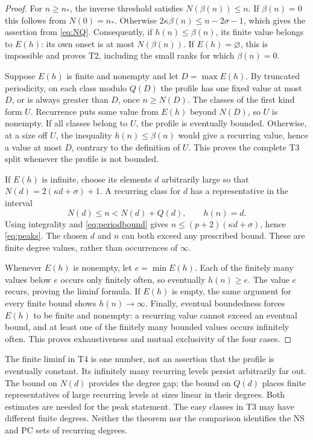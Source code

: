 \documentclass[11pt,a4paper]{article}
\theoremstyle{definition}\newtheorem{definition}[theorem]{Definition}
\theoremstyle{remark}\newtheorem{remark}[theorem]{Remark}
\begin{document}
\begin{proof}
For $n\ge n_*$, the inverse threshold satisfies $N(\beta(n))\le n$.
If $\beta(n)=0$ this follows from $N(0)=n_*$. Otherwise
$2\kappa\beta(n)\le n-2\sigma-1$, which gives the assertion from
\eqref{eq:NQ}. Consequently, if $h(n)\le\beta(n)$, its finite value
belongs to $E(h)$: its own onset is at most $N(\beta(n))$.
If $E(h)=\varnothing$, this is impossible and proves T2, including the
small ranks for which $\beta(n)=0$.

Suppose $E(h)$ is finite and nonempty and let $D=\max E(h)$.
By truncated periodicity, on each class modulo $Q(D)$ the profile has
one fixed value at most $D$, or is always greater than $D$, once
$n\ge N(D)$. The classes of the first kind form $U$. Recurrence puts
some value from $E(h)$ beyond $N(D)$, so $U$ is nonempty. If all classes
belong to $U$, the profile is eventually bounded. Otherwise, at a size
off $U$, the inequality $h(n)\le\beta(n)$ would give a recurring value,
hence a value at most $D$, contrary to the definition of $U$.
This proves the complete T3 split whenever the profile is not bounded.

If $E(h)$ is infinite, choose its elements $d$ arbitrarily large so that
$N(d)=2(\kappa d+\sigma)+1$. A recurring class for $d$ has a
representative in the interval
\[
              N(d)\le n<N(d)+Q(d),\qquad h(n)=d.
\]
Using integrality and \eqref{eq:periodbound} gives
$n\le(p+2)(\kappa d+\sigma)$, hence \eqref{eq:peaks}. The chosen $d$
and $n$ can both exceed any prescribed bound. These are finite degree
values, rather than occurrences of $\infty$.

Whenever $E(h)$ is nonempty, let $e=\min E(h)$. Each of the finitely
many values below $e$ occurs only finitely often, so eventually
$h(n)\ge e$. The value $e$ recurs, proving the liminf formula. If $E(h)$
is empty, the same argument for every finite bound shows $h(n)\to\infty$.
Finally, eventual boundedness forces $E(h)$ to be finite and nonempty:
a recurring value cannot exceed an eventual bound, and at least one of
the finitely many bounded values occurs infinitely often. This proves
exhaustiveness and mutual exclusivity of the four cases.
\end{proof}

The finite liminf in T4 is one number, not an assertion that the profile
is eventually constant. Its infinitely many recurring levels persist
arbitrarily far out. The bound on $N(d)$ provides the degree gap; the
bound on $Q(d)$ places finite representatives of large recurring levels
at sizes linear in their degrees. Both estimates are needed for the peak
statement. The easy classes in T3 may have different finite degrees.
Neither the theorem nor the comparison identifies the NS and PC sets of
recurring degrees.
\end{document}
